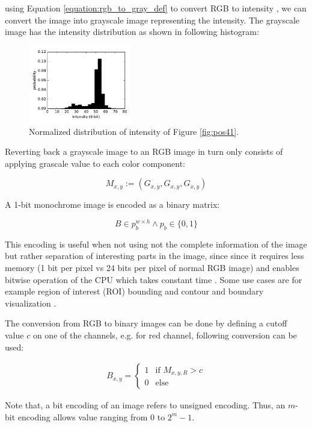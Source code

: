 \documentclass[pdftex,12pt,a4paper]{report}
\begin{document}
using Equation \ref{equation:rgb_to_gray_def} to convert RGB to intensity , we can convert the image into grayscale image representing the intensity. The grayscale image has the intensity distribution as shown in following histogram:

\begin{figure}[H]
\centering
\includegraphics[width=0.4\textwidth]{images/pos_41_in_t0_hist}
\caption{Normalized distribution of intensity of Figure \ref{fig:pos41}.}
\label{fig:pos41_density}
\end{figure}

Reverting back a grayscale image to an RGB image in turn only consists of applying grascale value to each color component:

$$
M_{x, y} := (G_{x, y}, G_{x, y}, G_{x, y})
$$

A 1-bit monochrome image is encoded as a binary matrix:

$$
B \in p_b^{w \times h} \land p_b \in \{0, 1\}
$$

This encoding is useful when not using not the complete information of the image but rather separation of interesting parts in the image, since since it requires less memory (1 bit per pixel vs 24 bits per pixel of normal RGB image) and enables bitwise operation of the CPU which takes constant time \cite{kernighan1988c}.  Some use cases are for example region of interest (ROI) bounding and contour and boundary visualization \cite{hartley2003multiple}.

The conversion from RGB to binary images can be done by defining a cutoff value $c$ on one of the channels, e.g. for red channel, following conversion can be used:

\begin{gather*}
B_{x, y} =
\begin{cases}
  1 & \text{if } M_{x, y, R} > c\\    
  0 & \text{else}  
\end{cases}
\end{gather*}

Note that, a bit encoding of an image refers to unsigned encoding. Thus, an $m$-bit encoding allows value ranging from $0$ to $2^m - 1$.
\end{document}

